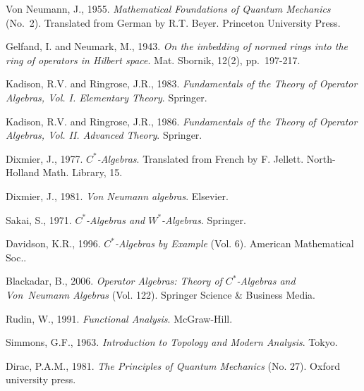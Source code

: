 \documentclass[11pt,a4paper]{report}
\theoremstyle{plain}
\theoremstyle{definition}
\newcommand{\1}{\mathbbm{1}}
\begin{document}
\begin{thebibliography}{00}
	Von Neumann, J., 1955.
	\emph{Mathematical Foundations of Quantum Mechanics} (No.~2). 
	Translated from German by R.T. Beyer.
	Princeton University Press.

	Gelfand, I. and Neumark, M., 1943. 
	\emph{On the imbedding of normed rings into the ring of operators in Hilbert 
	space}. 
	Mat. Sbornik, 12(2), pp.~197-217.
	
	Kadison, R.V. and Ringrose, J.R., 1983. 
	\emph{Fundamentals of the Theory of Operator Algebras, Vol. I. Elementary Theory}. 
	Springer.

	Kadison, R.V. and Ringrose, J.R., 1986. 
	\emph{Fundamentals of the Theory of Operator Algebras, Vol. II. Advanced Theory}. 
	Springer.

	Dixmier, J., 1977. \emph{$C^\ast$-Algebras}. 
	Translated from French by F. Jellett. 
	North-Holland Math. Library, 15.
	
	Dixmier, J., 1981. 
	\emph{Von Neumann algebras}. 
	Elsevier.

	Sakai, S., 1971. 
	\emph{$C^\ast$-Algebras and $W^\ast$-Algebras}. 
	Springer.

	Davidson, K.R., 1996. 
	\emph{$C^\ast$-Algebras by Example} (Vol. 6). 
	American Mathematical Soc..
	
	Blackadar, B., 2006. 
	\emph{Operator Algebras: Theory of $C^\ast$-Algebras and Von~Neumann 
	Algebras} (Vol. 122). 
	Springer Science \& Business Media.

	Rudin, W., 1991. 
	\emph{Functional Analysis}. 
	McGraw-Hill.
	
	Simmons, G.F., 1963. 
	\emph{Introduction to Topology and Modern Analysis}. 
	Tokyo.

	Dirac, P.A.M., 1981. 
	\emph{The Principles of Quantum Mechanics} (No. 27). 
	Oxford university press.
\end{thebibliography}
\end{document}
